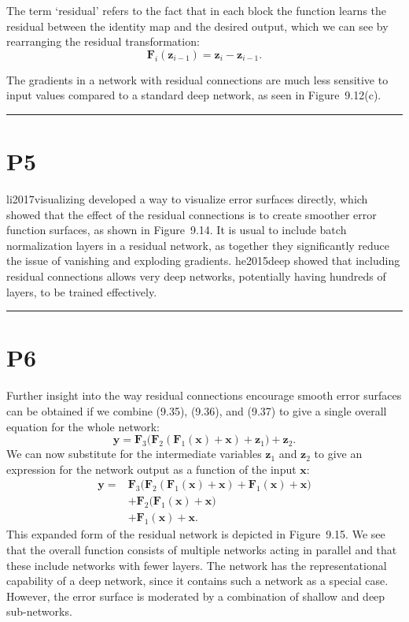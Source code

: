 \documentclass{article}
\begin{document}
The term `residual' refers to the fact that in each block the function learns the residual between the identity map and the desired output, which we can see by rearranging the residual transformation:
\begin{equation}
    \mathbf{F}_i(\mathbf{z}_{i-1}) = \mathbf{z}_i - \mathbf{z}_{i-1}.
    \label{eq:residual-def}
\end{equation}

The gradients in a network with residual connections are much less sensitive to input values compared to a standard deep network, as seen in Figure~9.12(c).

\noindent\rule{\linewidth}{0.4pt}

\section{P5}

{li2017visualizing} developed a way to visualize error surfaces directly, which showed that the effect of the residual connections is to create smoother error function surfaces, as shown in Figure~9.14. It is usual to include batch normalization layers in a residual network, as together they significantly reduce the issue of vanishing and exploding gradients. {he2015deep} showed that including residual connections allows very deep networks, potentially having hundreds of layers, to be trained effectively.

\noindent\rule{\linewidth}{0.4pt}

\section{P6}

Further insight into the way residual connections encourage smooth error surfaces can be obtained if we combine (9.35), (9.36), and (9.37) to give a single overall equation for the whole network:
\begin{equation}
    \mathbf{y} = \mathbf{F}_3\bigl( \mathbf{F}_2( \mathbf{F}_1(\mathbf{x}) + \mathbf{x} ) + \mathbf{z}_1 \bigr) + \mathbf{z}_2.
    \label{eq:resnet-combined}
\end{equation}
We can now substitute for the intermediate variables $\mathbf{z}_1$ and $\mathbf{z}_2$ to give an expression for the network output as a function of the input $\mathbf{x}$:
\begin{align}
    \mathbf{y} ={}& \mathbf{F}_3\bigl( \mathbf{F}_2( \mathbf{F}_1(\mathbf{x}) + \mathbf{x} ) + \mathbf{F}_1(\mathbf{x}) + \mathbf{x} \bigr) \nonumber\\
                 &+ \mathbf{F}_2\bigl( \mathbf{F}_1(\mathbf{x}) + \mathbf{x} \bigr) \nonumber\\
                 &+ \mathbf{F}_1(\mathbf{x}) + \mathbf{x}.
    \label{eq:resnet-expanded}
\end{align}
This expanded form of the residual network is depicted in Figure~9.15. We see that the overall function consists of multiple networks acting in parallel and that these include networks with fewer layers. The network has the representational capability of a deep network, since it contains such a network as a special case. However, the error surface is moderated by a combination of shallow and deep sub-networks.
\end{document}
